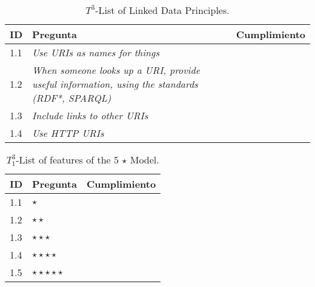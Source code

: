 \begin{table}[t]
\scriptsize
\renewcommand{\arraystretch}{1.3}
\begin{center}
\begin{tabular}[c]{|l|p{5cm}|c|} 
\hline
  \textbf{ID} & \textbf{Pregunta} &  \textbf{Cumplimiento}  \\\hline
   1.1&\textit{Use URIs as names for things} & \si  \\ \hline
   1.2&\textit{When someone looks up a URI, provide useful information, using the standards (RDF*, SPARQL)} & \si \\ \hline  
   1.3&\textit{Include links to other URIs} & \si \\ \hline    
   1.4&\textit{Use HTTP URIs} & \si \\ \hline    
   \hline
   \end{tabular}
  \caption{$T^{3}$-List of Linked Data Principles.}
  \label{table:validation-t3}
  \end{center}
\end{table} 

\begin{table}[t]
\scriptsize
\renewcommand{\arraystretch}{1.3}
\begin{center}
\begin{tabular}[c]{|l|p{5cm}|c|} 
\hline
  \textbf{ID} & \textbf{Pregunta} &  \textbf{Cumplimiento}  \\\hline
    1.1&$\star$	& \si \\ \hline 
    1.2&$\star \star$	 & \si \\ \hline 
    1.3&$\star \star \star$	& \si  \\ \hline 
    1.4&$\star \star \star \star$ & \si \\ \hline 
   1.5&$\star \star \star \star \star$ & \si \\ \hline 
   \end{tabular}
   \caption{$T^{3}_1$-List of features of the 5 $\star$ Model.}
   \label{table:validation-t31}
  \end{center}
\end{table} 


